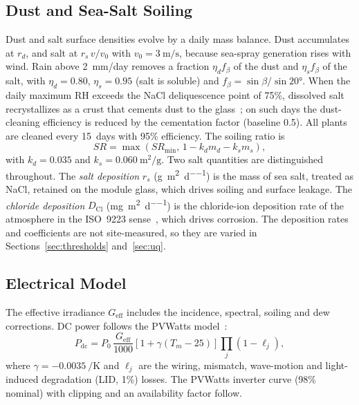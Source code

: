 \documentclass[journal]{IEEEtran}
\begin{document}
\subsection{Dust and Sea-Salt Soiling}
Dust and salt surface densities evolve by a daily mass balance. Dust accumulates at $r_d$, and salt at $r_s\,v/v_0$
with $v_0=\SI{3}{\metre\per\second}$, because sea-spray generation rises with wind. Rain above \SI{2}{mm/day} removes a
fraction $\eta_d f_\beta$ of the dust and $\eta_s f_\beta$ of the salt, with $\eta_d = 0.80$, $\eta_s = 0.95$ (salt is
soluble) and $f_\beta=\sin\beta/\sin\ang{20}$. When the daily maximum RH exceeds the NaCl deliquescence point of 75\%,
dissolved salt recrystallizes as a crust that cements dust to the glass~\cite{ahmad2026}; on such days the
dust-cleaning efficiency is reduced by the cementation factor (baseline 0.5). All plants are cleaned every 15~days with
95\% efficiency. The soiling ratio is
\begin{equation}
\mathit{SR} = \max\left(\mathit{SR}_{\min},\,1 - k_d m_d - k_s m_s\right),
\label{eq:soiling}
\end{equation}
with $k_d=0.035$ and $k_s=\SI{0.060}{\square\metre\per\gram}$. Two salt quantities are distinguished throughout.
The \emph{salt deposition} $r_s$ (\si{\gram\per\square\metre\per\day}) is the mass of sea salt, treated as NaCl,
retained on the module glass, which drives soiling and surface leakage. The \emph{chloride deposition} $D_{\mathrm{Cl}}$
(\si{\milli\gram\per\square\metre\per\day}) is the chloride-ion deposition rate of the atmosphere in the ISO~9223
sense~\cite{iso9223}, which drives corrosion. The deposition rates and coefficients are not site-measured, so they are
varied in Sections~\ref{sec:thresholds} and~\ref{sec:uq}.

\subsection{Electrical Model}
The effective irradiance $G_{\mathrm{eff}}$ includes the incidence, spectral, soiling and dew corrections. DC power
follows the PVWatts model~\cite{dobos2014}:
\begin{equation}
P_{\mathrm{dc}} = P_0\,\frac{G_{\mathrm{eff}}}{1000}\left[1+\gamma(T_m-25)\right]\prod_j(1-\ell_j),
\label{eq:pdc}
\end{equation}
where $\gamma=\SI{-0.0035}{\per\kelvin}$ and $\ell_j$ are the wiring, mismatch, wave-motion and light-induced
degradation (LID, 1\%) losses. The PVWatts inverter curve (98\% nominal) with clipping and an availability factor
follow.
\end{document}
